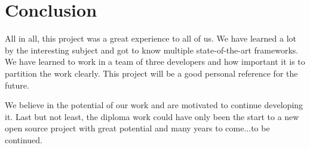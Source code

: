 \chapter{Conclusion}
\label{chapter:conclusion}

All in all, this project was a great experience to all of us. We have learned a lot by the interesting subject and got to know multiple state-of-the-art frameworks. We have learned to work in a team of three developers and how important it is to partition the work clearly. This project will be a good personal reference for the future.

We believe in the potential of our work and are motivated to continue developing it. Last but not least, the diploma work could have only been the start to a new open source project with great potential and many years to come...to be continued.